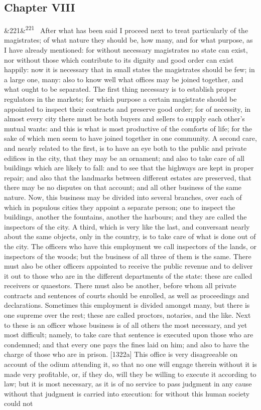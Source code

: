 \documentclass[12pt]{article}
\newcommand{\para}[1][]{\par\noindent\ifx&#1&\else\textsuperscript{\footnotesize #1}~\fi}
\begin{document}
\subsection*{Chapter VIII}

\para[221] After what has been said I proceed next to treat particularly of the magistrates; of what nature they should be, how many, and for what purpose, as I have already mentioned: for without necessary magistrates no state can exist, nor without those which contribute to its dignity and good order can exist happily: now it is necessary that in small states the magistrates should be few; in a large one, many: also to know well what offices may be joined together, and what ought to be separated. The first thing necessary is to establish proper regulators in the markets; for which purpose a certain magistrate should be appointed to inspect their contracts and preserve good order; for of necessity, in almost every city there must be both buyers and sellers to supply each other's mutual wants: and this is what is most productive of the comforts of life; for the sake of which men seem to have joined together in one community. A second care, and nearly related to the first, is to have an eye both to the public and private edifices in the city, that they may be an ornament; and also to take care of all buildings which are likely to fall: and to see that the highways are kept in proper repair; and also that the landmarks between different estates are preserved, that there may be no disputes on that account; and all other business of the same nature. Now, this business may be divided into several branches, over each of which in populous cities they appoint a separate person; one to inspect the buildings, another the fountains, another the harbours; and they are called the inspectors of the city. A third, which is very like the last, and conversant nearly about the same objects, only in the country, is to take care of what is done out of the city. The officers who have this employment we call inspectors of the lands, or inspectors of the woods; but the business of all three of them is the same. There must also be other officers appointed to receive the public revenue and to deliver it out to those who are in the different departments of the state: these are called receivers or quaestors. There must also be another, before whom all private contracts and sentences of courts should be enrolled, as well as proceedings and declarations. Sometimes this employment is divided amongst many, but there is one supreme over the rest; these are called proctors, notaries, and the like. Next to these is an officer whose business is of all others the most necessary, and yet most difficult; namely, to take care that sentence is executed upon those who are condemned; and that every one pays the fines laid on him; and also to have the charge of those who are in prison. [1322a] This office is very disagreeable on account of the odium attending it, so that no one will engage therein without it is made very profitable, or, if they do, will they be willing to execute it according to law; but it is most necessary, as it is of no service to pass judgment in any cause without that judgment is carried into execution: for without this human society could not 
\end{document}
